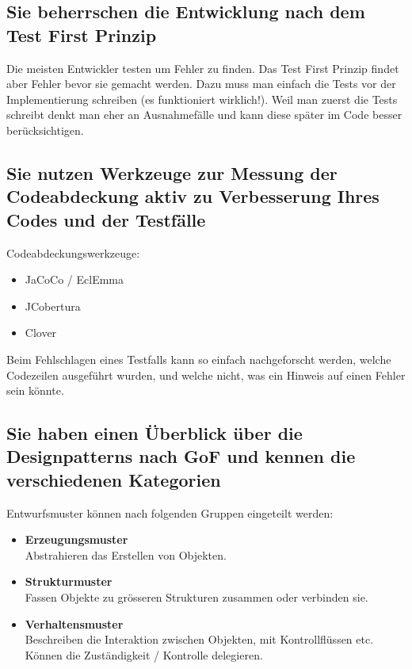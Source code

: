 \subsection{Sie beherrschen die Entwicklung nach dem Test First Prinzip}

Die meisten Entwickler testen um Fehler zu finden. Das Test First Prinzip findet aber Fehler bevor sie gemacht werden. 
Dazu muss man einfach die Tests vor der Implementierung schreiben (es funktioniert wirklich!). 
Weil man zuerst die Tests schreibt denkt man eher an Ausnahmefälle und kann diese später im Code besser berücksichtigen.

\subsection{Sie nutzen Werkzeuge zur Messung der Codeabdeckung aktiv zu Verbesserung Ihres Codes und der Testfälle}

Codeabdeckungswerkzeuge:
\begin{itemize}
	\item JaCoCo / EclEmma
	\item JCobertura
	\item Clover
\end{itemize}
Beim Fehlschlagen eines Testfalls kann so einfach nachgeforscht werden, welche Codezeilen ausgeführt wurden, und welche nicht, was ein Hinweis auf einen Fehler sein könnte.

\subsection{Sie haben einen Überblick über die Designpatterns nach GoF und kennen die verschiedenen Kategorien}

Entwurfsmuster können nach folgenden Gruppen eingeteilt werden:
\begin{itemize}
  \item \textbf{Erzeugungsmuster} \\
  Abstrahieren das Erstellen von Objekten.
  \item \textbf{Strukturmuster} \\
  Fassen Objekte zu grösseren Strukturen zusammen oder verbinden sie.
  \item \textbf{Verhaltensmuster} \\
  Beschreiben die Interaktion zwischen Objekten, mit Kontrollflüssen etc. Können die Zuständigkeit / Kontrolle delegieren.
  
\end{itemize}

